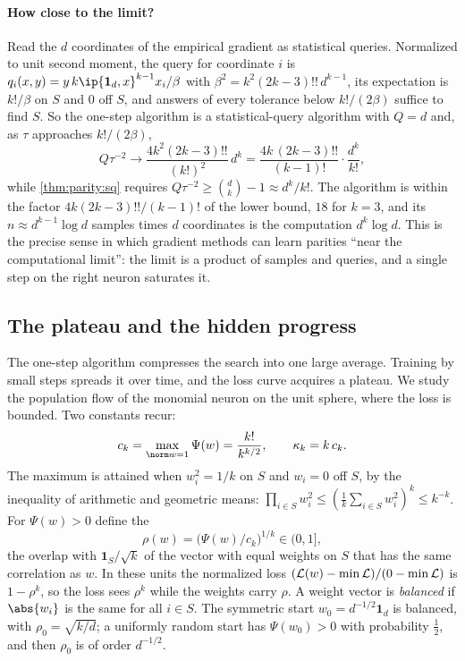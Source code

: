 \begin{refsection}
\paragraph{How close to the limit?} Read the $d$ coordinates of the empirical gradient as statistical queries. Normalized to unit second moment, the query for coordinate $i$ is $q_i(x,y)=y\,k\ip{\mathbf 1_d,x}^{k-1}x_i/\beta$ with $\beta^2=k^2(2k-3)!!\,d^{k-1}$, its expectation is $k!/\beta$ on $S$ and $0$ off $S$, and answers of every tolerance below $k!/(2\beta)$ suffice to find $S$. So the one-step algorithm is a statistical-query algorithm with $Q=d$ and, as $\tau$ approaches $k!/(2\beta)$,
\[
  Q\tau^{-2}\to\frac{4k^2(2k-3)!!}{(k!)^2}\,d^k=\frac{4k\,(2k-3)!!}{(k-1)!}\cdot\frac{d^k}{k!},
\]
while \cref{thm:parity:sq} requires $Q\tau^{-2}\ge\binom dk-1\approx d^k/k!$. The algorithm is within the factor $4k(2k-3)!!/(k-1)!$ of the lower bound, $18$ for $k=3$, and its $n\approx d^{k-1}\log d$ samples times $d$ coordinates is the computation $d^k\log d$. This is the precise sense in which gradient methods can learn parities ``near the computational limit'': the limit is a product of samples and queries, and a single step on the right neuron saturates it.

\subsection{The plateau and the hidden progress}\label{sec:parity:hidden}

The one-step algorithm compresses the search into one large average. Training by small steps spreads it over time, and the loss curve acquires a plateau. We study the population flow of the monomial neuron on the unit sphere, where the loss is bounded. Two constants recur:
\begin{equation}\label{eq:parity:constants}
  c_k=\max_{\norm w=1}\Psi(w)=\frac{k!}{k^{k/2}},\qquad\kappa_k=k\,c_k .
\end{equation}
The maximum is attained when $w_i^2=1/k$ on $S$ and $w_i=0$ off $S$, by the inequality of arithmetic and geometric means: $\prod_{i\in S}w_i^2\le(\frac1k\sum_{i\in S}w_i^2)^k\le k^{-k}$. For $\Psi(w)>0$ define the 
\[
  \rho(w)=\bigl(\Psi(w)/c_k\bigr)^{1/k}\in(0,1],
\]
the overlap with $\mathbf 1_S/\sqrt k$ of the vector with equal weights on $S$ that has the same correlation as $w$. In these units the normalized loss $(\mathcal{L}(w)-\min\mathcal{L})/(0-\min\mathcal{L})$ is $1-\rho^k$, so the loss sees $\rho^k$ while the weights carry $\rho$. A weight vector is \emph{balanced} if $\abs{w_i}$ is the same for all $i\in S$. The symmetric start $w_0=d^{-1/2}\mathbf 1_d$ is balanced, with $\rho_0=\sqrt{k/d}$; a uniformly random start has $\Psi(w_0)>0$ with probability $\frac12$, and then $\rho_0$ is of order $d^{-1/2}$.


\end{refsection}
